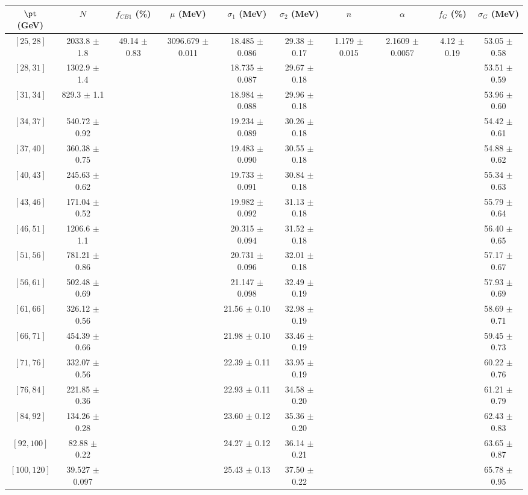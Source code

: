 \begin{tabular}{c||c|c|c|c|c|c|c|c|c}
$\pt$ (GeV) & $N$ & $f_{CB1}$ (\%)  & $\mu$ (MeV) & $\sigma_1$ (MeV) & $\sigma_2$ (MeV) & $n$ & $\alpha$ & $f_G$ (\%) & $\sigma_G$ (MeV) \\
\hline
$[25, 28]$ & 2033.8 $\pm$ 1.8 & \multirow{17}{*}{49.14 $\pm$ 0.83} & \multirow{17}{*}{3096.679 $\pm$ 0.011} & 18.485 $\pm$ 0.086 & 29.38 $\pm$ 0.17 & \multirow{17}{*}{1.179 $\pm$ 0.015} & \multirow{17}{*}{2.1609 $\pm$ 0.0057} & \multirow{17}{*}{4.12 $\pm$ 0.19} & 53.05 $\pm$ 0.58\\
$[28, 31]$ & 1302.9 $\pm$ 1.4 &  &  & 18.735 $\pm$ 0.087 & 29.67 $\pm$ 0.18 &  &  &  & 53.51 $\pm$ 0.59\\
$[31, 34]$ & 829.3 $\pm$ 1.1 &  &  & 18.984 $\pm$ 0.088 & 29.96 $\pm$ 0.18 &  &  &  & 53.96 $\pm$ 0.60\\
$[34, 37]$ & 540.72 $\pm$ 0.92 &  &  & 19.234 $\pm$ 0.089 & 30.26 $\pm$ 0.18 &  &  &  & 54.42 $\pm$ 0.61\\
$[37, 40]$ & 360.38 $\pm$ 0.75 &  &  & 19.483 $\pm$ 0.090 & 30.55 $\pm$ 0.18 &  &  &  & 54.88 $\pm$ 0.62\\
$[40, 43]$ & 245.63 $\pm$ 0.62 &  &  & 19.733 $\pm$ 0.091 & 30.84 $\pm$ 0.18 &  &  &  & 55.34 $\pm$ 0.63\\
$[43, 46]$ & 171.04 $\pm$ 0.52 &  &  & 19.982 $\pm$ 0.092 & 31.13 $\pm$ 0.18 &  &  &  & 55.79 $\pm$ 0.64\\
$[46, 51]$ & 1206.6 $\pm$ 1.1 &  &  & 20.315 $\pm$ 0.094 & 31.52 $\pm$ 0.18 &  &  &  & 56.40 $\pm$ 0.65\\
$[51, 56]$ & 781.21 $\pm$ 0.86 &  &  & 20.731 $\pm$ 0.096 & 32.01 $\pm$ 0.18 &  &  &  & 57.17 $\pm$ 0.67\\
$[56, 61]$ & 502.48 $\pm$ 0.69 &  &  & 21.147 $\pm$ 0.098 & 32.49 $\pm$ 0.19 &  &  &  & 57.93 $\pm$ 0.69\\
$[61, 66]$ & 326.12 $\pm$ 0.56 &  &  & 21.56 $\pm$ 0.10 & 32.98 $\pm$ 0.19 &  &  &  & 58.69 $\pm$ 0.71\\
$[66, 71]$ & 454.39 $\pm$ 0.66 &  &  & 21.98 $\pm$ 0.10 & 33.46 $\pm$ 0.19 &  &  &  & 59.45 $\pm$ 0.73\\
$[71, 76]$ & 332.07 $\pm$ 0.56 &  &  & 22.39 $\pm$ 0.11 & 33.95 $\pm$ 0.19 &  &  &  & 60.22 $\pm$ 0.76\\
$[76, 84]$ & 221.85 $\pm$ 0.36 &  &  & 22.93 $\pm$ 0.11 & 34.58 $\pm$ 0.20 &  &  &  & 61.21 $\pm$ 0.79\\
$[84, 92]$ & 134.26 $\pm$ 0.28 &  &  & 23.60 $\pm$ 0.12 & 35.36 $\pm$ 0.20 &  &  &  & 62.43 $\pm$ 0.83\\
$[92, 100]$ & 82.88 $\pm$ 0.22 &  &  & 24.27 $\pm$ 0.12 & 36.14 $\pm$ 0.21 &  &  &  & 63.65 $\pm$ 0.87\\
$[100, 120]$ & 39.527 $\pm$ 0.097 &  &  & 25.43 $\pm$ 0.13 & 37.50 $\pm$ 0.22 &  &  &  & 65.78 $\pm$ 0.95\\
\end{tabular}
